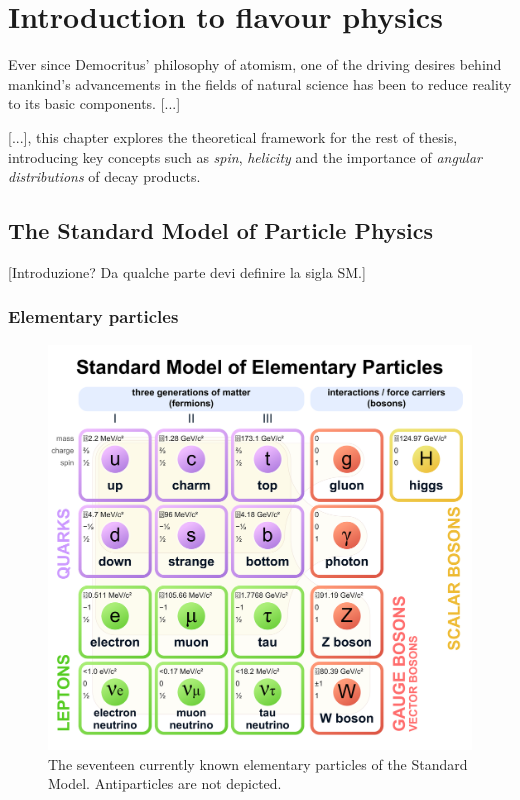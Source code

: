 \chapter{Introduction to flavour physics}
Ever since Democritus' philosophy of atomism, one of the driving desires behind mankind's advancements in the fields of natural science has been to reduce reality to its basic components. [...]

[...], this chapter explores the theoretical framework for the rest of thesis, introducing key concepts such as \textit{spin}, \textit{helicity} and the importance of \textit{angular distributions} of decay products.

\section{The Standard Model of Particle Physics}
[Introduzione? Da qualche parte devi definire la sigla SM.]

\subsection{Elementary particles}
\begin{figure}[t!]
	\centering
	\includegraphics[scale=0.15]{graphics/01-standard_model/Standard_Model_of_Elementary_Particles.pdf}
	\caption[Currently known Standard Model elementary particles.]{The seventeen currently known elementary particles of the Standard Model. Antiparticles are not depicted.}
	\label{fig:particle_zoo}
\end{figure}

